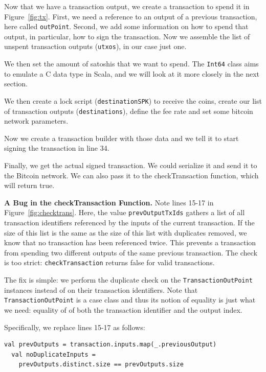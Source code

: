\documentclass[runningheads]{llncs}
\renewcommand{\paragraph}{\textbf}%
\begin{document}
Now that we have a transaction output, we create a transaction to
spend it in Figure~\ref{fig:tx}. First, we need a reference to an
output of a previous transaction, here called
\texttt{outPoint}. Second, we add some information on how to spend
that output, in particular, how to sign the transaction. Now we
assemble the list of unspent transaction outputs (\texttt{utxos}), in our case
just one.

We then set the amount of satoshis that we want to spend. The \texttt{Int64}
class aims to emulate a C data type in Scala, and we will look at it
more closely in the next section.

We then create a lock script (\texttt{destinationSPK}) to receive the
coins, create our list of transaction outputs (\texttt{destinations}),
define the fee rate and set some bitcoin network parameters.

Now we create a transaction builder with those data and we tell it to
start signing the transaction in line 34.

Finally, we get the actual signed transaction. We could serialize it
and send it to the Bitcoin network. We can also pass it to the
checkTransaction function, which will return true.

\paragraph{A Bug in the checkTransaction Function.} Note lines 15-17
in Figure~\ref{fig:checktrans}. Here, the value
\texttt{prevOutputTxIds} gathers a list of all transaction identifiers
referenced by the inputs of the current transaction. If the size of
this list is the same as the size of this list with duplicates
removed, we know that no transaction has been referenced twice. This
prevents a transaction from spending two different outputs of the same
previous transaction. The check is too strict:
\texttt{checkTransaction} returns false for valid transactions.

The fix is simple: we perform the duplicate check on the
\texttt{TransactionOutPoint} instances instead of on their transaction
identifiers. Note that \texttt{TransactionOutPoint} is a case class
and thus its notion of equality is just what we need: equality of of
both the transaction identifier and the output index.

Specifically, we replace lines 15-17 as follows:
\begin{lstlisting}[style=scala, firstnumber=15]
  val prevOutputs = transaction.inputs.map(_.previousOutput)
  val noDuplicateInputs = 
    prevOutputs.distinct.size == prevOutputs.size
\end{lstlisting}
\end{document}
